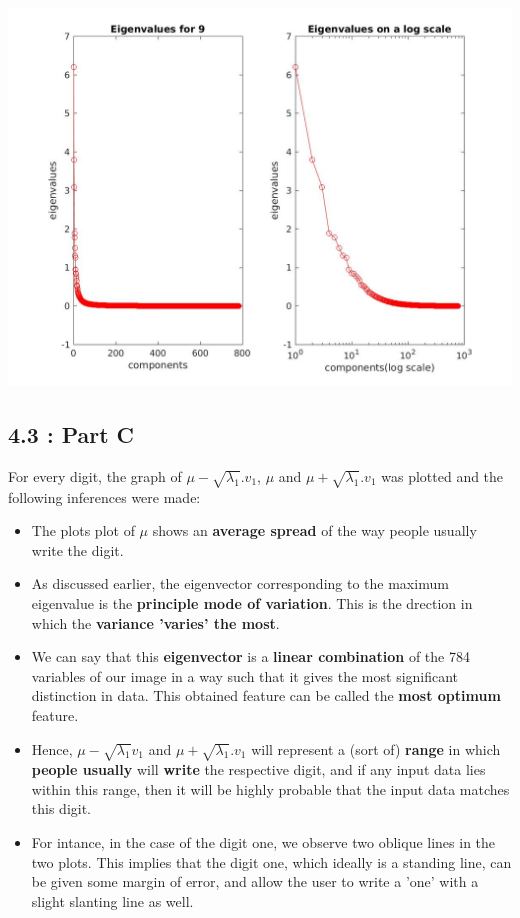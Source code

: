 \documentclass[12pt, a4paper]{article}
\begin{document}
\includegraphics[width=\textwidth, height = 0.25\paperheight]{Eigen_9}

\newpage
\subsection*{4.3 : Part C}
 For every digit, the graph of $\mu - \sqrt{\lambda_1}.v_1$, $\mu$ and $\mu + \sqrt{\lambda_1}.v_1$ was plotted and the following inferences were made:
 \begin{itemize}
 \item The plots plot of \textbf{$\mu$} shows an \textbf{average spread} of the way people usually write the digit.
 \item As discussed earlier, the eigenvector corresponding to the maximum eigenvalue is the \textbf{principle mode of variation}. This is the drection in which the \textbf{variance 'varies' the most}.
 \item We can say that this \textbf{eigenvector} is a \textbf{linear combination} of the 784 variables of our image in a way such that it gives the most significant distinction in data. This obtained feature can be called the \textbf{most optimum} feature.
 \item Hence, $\mu - \sqrt{\lambda_1}v_1$ and $\mu + \sqrt{\lambda_1}.v_1$ will represent a (sort of) \textbf{range} in which \textbf{people usually} will \textbf{write} the respective digit, and if any input data lies within this range, then it will be highly probable that the input data matches this digit.
 \item For intance, in the case of the digit one, we observe two oblique lines in the two plots. This implies that the digit one, which ideally is a standing line, can be given some margin of error, and allow the user to write a 'one' with a slight slanting line as well.
 \end{itemize}
 
\end{document}
